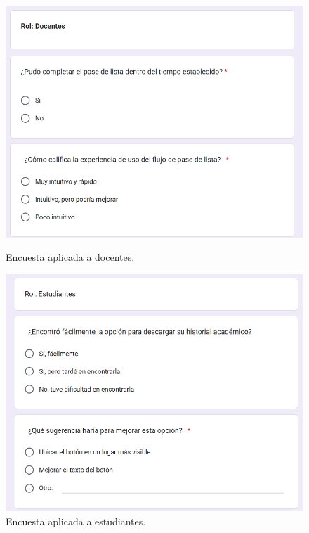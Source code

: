 \begin{figure}[H]
    \centering
    \begin{minipage}[b]{0.50\textwidth}
        \centering
        \includegraphics[width=1.0\textwidth]{./Media/p1.png}
        \caption{Encuesta aplicada a docentes.}
    \end{minipage}

    \begin{minipage}[b]{0.50\textwidth}
        \centering
        \includegraphics[width=1.0\textwidth]{./Media/p2.png}
        \caption{Encuesta aplicada a estudiantes.}
    \end{minipage}


\end{figure}
